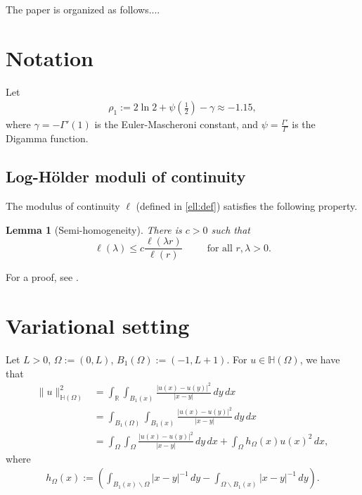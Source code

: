 \documentclass[11 pt]{article}
\newtheorem{lemma}[theorem]{Lemma}
\numberwithin{equation}{section}
\def\R{\mathbb{R}}
\def\mH{\mathbb{H}}
\begin{document}
The paper is organized as follows....





\section{Notation}
Let
\begin{align}\label{constants}
\rho_1:=2\ln 2 + \psi(\tfrac{1}{2})-\gamma\approx -1.15,
\end{align}
where $\gamma=-\Gamma'(1)$ is the Euler-Mascheroni constant, and $\psi=\frac{\Gamma'}{\Gamma}$ is the Digamma function.



\subsection{Log-Hölder moduli of continuity}

The modulus of continuity $\ell$ (defined in \eqref{ell:def}) satisfies the following property.

\begin{lemma}[Semi-homogeneity]\label{prop1}
There is $c>0$ such that 
\[
\ell(\lambda)\leq c\frac{\ell(\lambda r)}{\ell(r)}\,\qquad \text{ for all }r,\lambda >0.
\]
\end{lemma}
For a proof, see \cite[Lemma 3.2]{CS22}.


\section{Variational setting}
Let $L>0$, $\Omega:=(0,L)$, $B_1(\Omega):=(-1,L+1)$. For $u\in \mH(\Omega)$, we have that
\begin{align*}
    \|u\|^2_{\mathbb H(\Omega)}&=\int_{\R}\int_{B_1(x)}\frac{|u(x)-u(y)|^2}{|x-y|}\, dy\, dx\\
    &=\int_{B_1(\Omega)}\int_{B_1(x)}\frac{|u(x)-u(y)|^2}{|x-y|}\, dy\, dx\\
    &=\int_\Omega\int_\Omega \frac{|u(x)-u(y)|^2}{|x-y|}\, dy\, dx+\int_{\Omega}h_\Omega(x)u(x)^2\, dx,
\end{align*}
where
\begin{align*}
    h_\Omega(x):=\left(\int_{B_1(x)\backslash \Omega}|x-y|^{-1}\, dy - \int_{\Omega\backslash B_1(x)}|x-y|^{-1}\, dy\right).
\end{align*}
\end{document}
